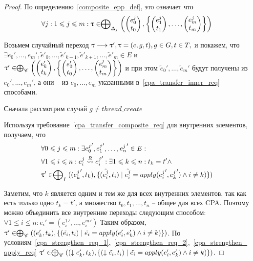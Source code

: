 \begin{itemize}
\begin{proof}
По определению~\ref{composite_epp_def}, это означает что
$$\forall j: 1\leqslant j \leqslant m: \uptau \in  \mathrel{\bigoplus}_{\Delta_j}
\left(
\begin{pmatrix}
e^j_0 \\
t_0 
\end{pmatrix},
\left\{
\begin{pmatrix}
e^j_1 \\
t_1 
\end{pmatrix},
\dots ,
\begin{pmatrix}
e^j_m \\
t_m 
\end{pmatrix}
\right\}
\right)$$

Возьмем случайный переход
$ \uptau \longrightarrow \uptau', \uptau=(c,g,t), g \in G, t \in T, $ и покажем, что 
$\exists e_0', \dots, e_m', \tilde{e}'_0, \dots, \tilde{e}'_{k-1}, \tilde{e}'_{k+1}, \dots, \tilde{e}'_m \in E$ и
$\uptau' \in  \mathrel{\bigoplus}_{\mathscr{C}}
\left(
\begin{pmatrix}
e'_k \\
t_k 
\end{pmatrix},
\left\{
\begin{pmatrix}
\tilde{e'_0} \\
t_0 
\end{pmatrix},
\dots ,
\begin{pmatrix}
\tilde{e'_m} \\
t_m 
\end{pmatrix}
\right\}
\right)$ 
и при этом $\tilde{e}_0', \dots, \tilde{e}_m'$ будут получены из $e_0', \dots, e_m'$, а они -- из $e_0, \dots, e_m$ указанными в~\ref{cpa_transfer_inner_req} способами.

Сначала рассмотрим случай $g \neq thread\_create$

Используя требование~\ref{cpa_transfer_composite_req} для внутренних элементов, получаем, что 
\begin{align*}
& \forall 0 \leqslant j \leqslant m: \exists {e^j_0}', {e^j_1}', \dots, {e^j_n}' \in E: \\
& \forall 1 \leqslant i \leqslant n: e^j_i \stackrel{R}{\leadsto} {e^j_i}': \exists 1 \leqslant k \leqslant n: t_k = t' \land \\
& \uptau' \in \mathrel{\bigoplus}_I(({e^j_k}', t_k), \{(\tilde{e^j_i}, t_i) \mid \tilde{e^j_i} = apply({e^j_i}', {e^j_k}') \land i \neq k)\})
\end{align*}

Заметим, что $k$ является одним и тем же для всех внутренних элементов, так как есть только одно $t_k = t'$, а множество $t_0, t_1, \dots, t_n$ -- общее для всех CPA.
Поэтому можно объединить все внутренние переходы следующим способом:
$ \forall 1 \le i \le n: e_i' = ({e^1_i}', \dots, {e^m_i}')$
Таким образом, $\uptau' \in \mathrel{\bigoplus}_{\mathscr{C}}((e_k', t_k), \{(\tilde{e_i}, t_i) \mid \tilde{e_i} = apply(e'_i, e'_k) \land i \neq k)\})$.
По условиям~\ref{cpa_strengthen_req_1},~\ref{cpa_strengthen_req_2},~\ref{cpa_strengthen_apply_req} $\uptau' \in \mathrel{\bigoplus}_{\mathscr{C}}((\downarrow e_k', t_k), \{(\downarrow \tilde{e_i}, t_i) \mid \tilde{e_i} = apply(e'_i, e'_k) \land i \neq k)\})$.


\end{proof}
\end{itemize}
